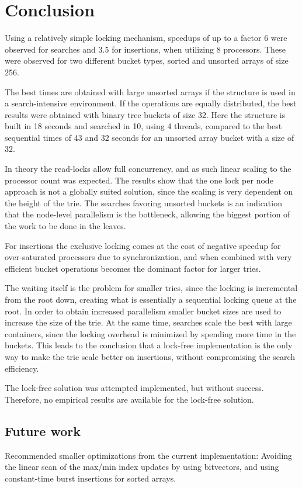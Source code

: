 \chapter{Conclusion}

Using a relatively simple locking mechanism, speedups of up to a factor $6$
were observed for searches and $3.5$ for insertions, when utilizing 8
processors. These were observed for two different bucket types, sorted
and unsorted arrays of size 256.

The best times are obtained with large unsorted arrays if the structure is
used in a search-intensive environment. If the operations are equally
distributed, the best results were obtained with binary tree buckets of size 32.
Here the structure is built in 18 seconds and searched in 10, using 4 threads,
compared to the best sequential times of 43 and 32 seconds for an unsorted
array bucket with a size of 32.


In theory the read-locks allow full concurrency, and as such linear scaling to the
processor count was expected. The results show that the one lock per node
approach is not a globally suited solution, since the scaling is very dependent
on the height of the trie. The searches favoring unsorted buckets is an indication
that the node-level parallelism is the bottleneck, allowing the biggest portion
of the work to be done in the leaves.

For insertions the exclusive locking comes at the cost of negative speedup for
over-saturated processors due to synchronization, and when combined with very
efficient bucket operations becomes the dominant factor for larger tries.

The waiting itself is the problem for smaller tries, since the locking is
incremental from the root down, creating what is essentially a sequential
locking queue at the root. In order to obtain increased parallelism smaller
bucket sizes are used to increase the size of the trie. At the same time,
searches scale the best with large containers, since the locking overhead
is minimized by spending more time in the buckets.
This leads to the conclusion that a lock-free implementation is the only
way to make the trie scale better on insertions, without compromising
the search efficiency.

The lock-free solution was attempted implemented, but without success.
Therefore, no empirical results are available for the lock-free solution.

\section{Future work}
Recommended smaller optimizations from the current implementation:
Avoiding the linear scan of the {\keyword max/min} index updates by using
bitvectors, and using constant-time burst insertions for sorted arrays.


